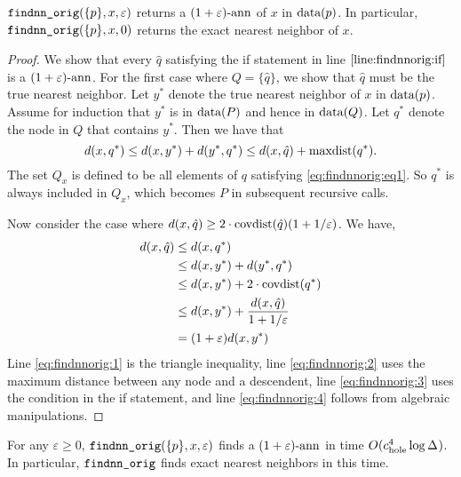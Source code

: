 \documentclass[../main.tex]{subfiles}
\newcommand{\dist}[2]{\distf({#1},{#2})}
\newcommand{\distf}{d}
\newcommand{\aspect}[1]{\Delta_{#1}}
\newcommand{\cdoub}{c_\textnormal{doub}}
\newcommand{\chole}{c_\textnormal{hole}}
\newcommand{\mkfunction}[1]{\ifmmode{\textnormal{{#1}}}}
\newcommand{\covdist}[1]    {\mkfunction{covdist}({#1})}
\newcommand{\maxdist}[1]    {\mkfunction{maxdist}({#1})}
\newcommand{\data}[1]       {\mkfunction{data}({#1})}
\newcommand{\mkprocedure}[1]{\textnormal{\ttfamily {#1}}}
\newcommand{\findnn}{\mkprocedure{findnn}}
\newcommand{\findnnorig}{\mkprocedure{findnn\_orig}}
\begin{document}
\begin{theorem}
    \label{theorem:findnnorig:correct}
    $\findnnorig(\{p\}, x, \varepsilon)$ returns a $(1+\varepsilon)\text{-ann}$ of $x$ in $\data{p}$.
    In particular, $\findnnorig(\{p\},x,0)$ returns the exact nearest neighbor of $x$.
\end{theorem}
\begin{proof}
    We show that every $\hat q$ satisfying the if statement in line $\ref{line:findnnorig:if}$ is a $(1+\varepsilon)\text{-ann}$.
    For the first case where $Q=\{\hat q\}$, 
    we show that $\hat q$ must be the true nearest neighbor.
    Let $y^*$ denote the true nearest neighbor of $x$ in $\data{p}$.
    Assume for induction that $y^*$ is in $\data{P}$ and hence in $\data{Q}$.
    Let $q^*$ denote the node in $Q$ that contains $y^*$.
    Then we have that
    \begin{equation}
        \label{eq:findnnorig:eq1}
        \dist{x}{q^*}
        \le \dist{x}{y^*} + \dist{y^*}{q^*}
        \le \dist{x}{\hat q} + \maxdist{q^*}
        .
    \end{equation}
    The set $Q_x$ is defined to be all elements of $q$ satisfying \eqref{eq:findnnorig:eq1}.
    So $q^*$ is always included in $Q_x$,
    which becomes $P$ in subsequent recursive calls.

    Now consider the case where $\dist{x}{\hat q} \ge 2\cdot\covdist{\hat q}(1+1/\varepsilon)$.
    We have,
    \begin{align}
        \dist{x}{\hat q}
        &\le \dist{x}{q^*}
        \\&\le \dist{x}{y^*} + \dist{y^*}{q^*}
        \label{eq:findnnorig:1}
        \\
        &\le \dist{x}{y^*} + 2\cdot\covdist{q^*}
        \label{eq:findnnorig:2}
        \\
        &\le \dist{x}{y^*} + \frac{\dist{x}{\hat q}}{1+1/\varepsilon}
        \label{eq:findnnorig:3}
        \\
        &= (1+\varepsilon)\dist{x}{y^*}
        \label{eq:findnnorig:4}
    \end{align}
    Line \eqref{eq:findnnorig:1} is the triangle inequality,
    line \eqref{eq:findnnorig:2} uses the maximum distance between any node and a descendent,
    line \eqref{eq:findnnorig:3} uses the condition in the if statement,
    and line \eqref{eq:findnnorig:4} follows from algebraic manipulations.
\end{proof}

\begin{theorem}
    \label{theorem:findnn:runtime:approx}
    For any $\varepsilon\ge0$, $\findnnorig(\{p\},x,\varepsilon)$ finds a $(1+\varepsilon)\text{-ann}$ in time $O(\chole^4\log\aspect{})$.
    In particular, $\findnnorig$ finds exact nearest neighbors in this time.
\end{theorem}
\end{document}
